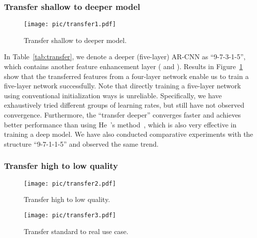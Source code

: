\documentclass[10pt,twocolumn,letterpaper]{article}
\begin{document}
\subsubsection{Transfer shallow to deeper model}
\label{sec:transfer1}

\begin{figure}[t]\small
\begin{center}
 \texttt{[image: pic/transfer1.pdf]}
\vskip -0.15cm
\caption{Transfer shallow to deeper model.}
\label{fig:transfer1}
\vspace{-0.75cm}
\end{center}
\end{figure}

In Table~\ref{tab:transfer}, we denote a deeper (five-layer) AR-CNN as ``9-7-3-1-5'',  which contains another feature enhancement layer ( and ).
Results in Figure~\ref{fig:transfer1} show that the transferred features from a four-layer network enable us to train a five-layer network successfully. Note that directly training a five-layer network using conventional initialization ways is unreliable. Specifically, we have exhaustively tried different groups of learning rates, but still have not observed convergence. Furthermore, the ``transfer deeper'' converges faster and achieves better performance than using He~\etal's method~\cite{He2015}, which is also very effective in training a deep model. We have also conducted comparative experiments with the structure ``9-7-1-1-5'' and observed the same trend.


\subsubsection{Transfer high to low quality}
\label{sec:transfer2}
\begin{figure}[t]\small
\begin{center}
 \texttt{[image: pic/transfer2.pdf]}
\vskip -0.15cm
\caption{Transfer high to low quality.}
\label{fig:transfer2}
\vspace{-0.75cm}
\end{center}
\end{figure}

\begin{figure}[t]\small
\begin{center}
 \texttt{[image: pic/transfer3.pdf]}
\vskip -0.15cm
\caption{Transfer standard to real use case.}
\label{fig:transfer3}
\vspace{-0.75cm}
\end{center}
\end{figure}
\end{document}
